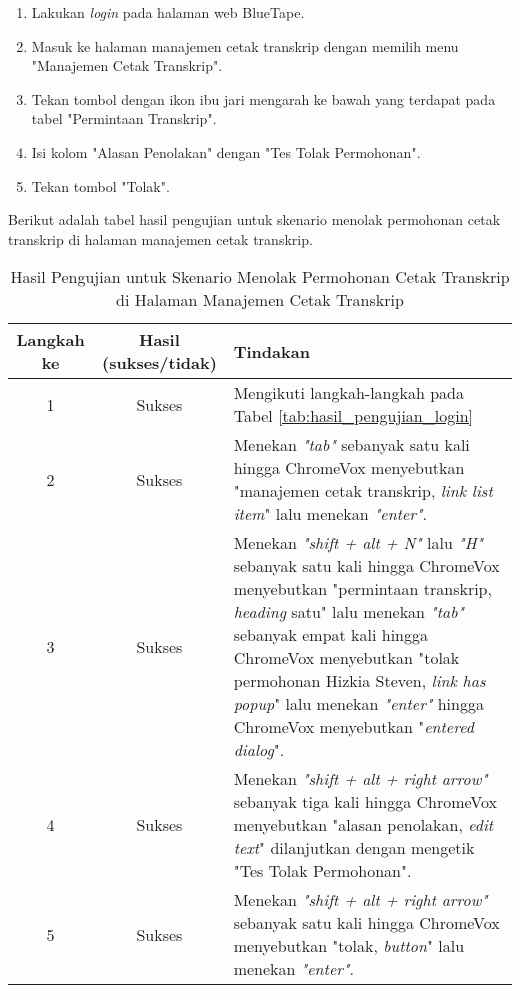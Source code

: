 \begin{enumerate}
    \item Lakukan \textit{login} pada halaman web BlueTape.
    \item Masuk ke halaman manajemen cetak transkrip dengan memilih menu "Manajemen Cetak Transkrip".
    \item Tekan tombol dengan ikon ibu jari mengarah ke bawah yang terdapat pada tabel "Permintaan Transkrip".
    \item Isi kolom "Alasan Penolakan" dengan "Tes Tolak Permohonan".
    \item Tekan tombol "Tolak".
\end{enumerate}

Berikut adalah tabel hasil pengujian untuk skenario menolak permohonan cetak transkrip di halaman manajemen cetak transkrip.

\begin{table}[H]
    \centering 
    \caption{Hasil Pengujian untuk Skenario Menolak Permohonan Cetak Transkrip di Halaman Manajemen Cetak Transkrip}
    \label{tab:hasil_pengujian_menolak_permohonan_cetak_transkrip_di_halaman_manajemen_cetak_transkrip}
    \begin{tabular}{|c|c|p{10cm}|}
        \toprule
        Langkah ke & Hasil (sukses/tidak) & Tindakan \\

        \midrule
        1 & Sukses & Mengikuti langkah-langkah pada Tabel \ref{tab:hasil_pengujian_login} \\
        2 & Sukses & Menekan \textit{"tab"} sebanyak satu kali hingga ChromeVox menyebutkan "manajemen cetak transkrip, \textit{link list item}" lalu menekan \textit{"enter"}. \\
        3 & Sukses & Menekan \textit{"shift + alt + N"} lalu \textit{"H"} sebanyak satu kali hingga ChromeVox menyebutkan "permintaan transkrip, \textit{heading} satu" lalu menekan \textit{"tab"} sebanyak empat kali hingga ChromeVox menyebutkan "tolak permohonan Hizkia Steven, \textit{link has popup}" lalu menekan \textit{"enter"} hingga ChromeVox menyebutkan "\textit{entered dialog}". \\
        4 & Sukses & Menekan \textit{"shift + alt + right arrow"} sebanyak tiga kali hingga ChromeVox menyebutkan "alasan penolakan, \textit{edit text}" dilanjutkan dengan mengetik "Tes Tolak Permohonan". \\
        5 & Sukses & Menekan \textit{"shift + alt + right arrow"} sebanyak satu kali hingga ChromeVox menyebutkan "tolak, \textit{button}" lalu menekan \textit{"enter"}. \\ 

        \bottomrule

    \end{tabular}
\end{table}

